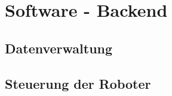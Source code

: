 
\section{Software - Backend}
\label{sec:software_backend}

\subsection{Datenverwaltung}
\label{subsec:backend_data}

\subsection{Steuerung der Roboter}
\label{subsec:backend_robot_detection}

